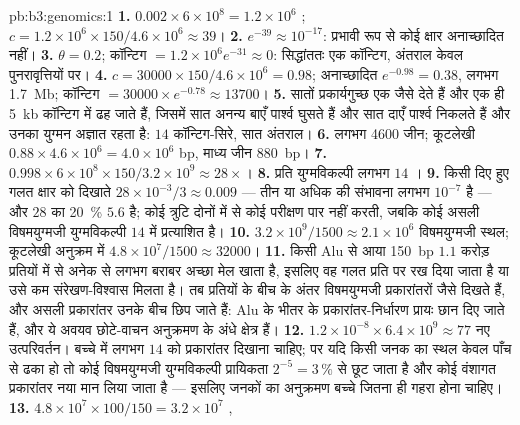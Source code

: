 \begin{solution}{pb:b3:genomics:1}
\textbf{1.} $0.002\times 6\times 10^{8} = 1.2\times 10^{6}$ ;
$c = 1.2\times 10^{6}\times 150/4.6\times 10^{6} \approx 39$।
\textbf{2.} $e^{-39} \approx 10^{-17}$: प्रभावी रूप से कोई क्षार
अनाच्छादित नहीं।
\textbf{3.} $\theta = 0.2$; कॉन्टिग $= 1.2\times 10^{6} e^{-31} \approx
0$: सिद्धांततः एक कॉन्टिग, अंतराल केवल पुनरावृत्तियों पर।
\textbf{4.} $c = \num{30000}\times 150/4.6\times 10^{6} = 0.98$;
अनाच्छादित $e^{-0.98} = 0.38$, लगभग \qty{1.7}{Mb}; कॉन्टिग $= \num{30000}
\times e^{-0.78} \approx \num{13700}$।
\textbf{5.} सातों प्रकार्यगुच्छ एक जैसे  देते हैं और एक ही
\qty{5}{kb} कॉन्टिग में ढह जाते हैं, जिसमें सात अनन्य बाएँ पार्श्व
घुसते हैं और सात दाएँ पार्श्व निकलते हैं और उनका युग्मन अज्ञात रहता है:
$14$ कॉन्टिग-सिरे, सात अंतराल।
\textbf{6.} लगभग \num{4600} जीन; कूटलेखी $0.88\times 4.6\times 10^{6}
= 4.0\times 10^{6}$ bp, माध्य जीन \qty{880}{bp}।
\textbf{7.} $0.998\times 6\times 10^{8}\times 150/3.2\times 10^{9}
\approx 28\times$।
\textbf{8.} प्रति युग्मविकल्पी लगभग $14$ ।
\textbf{9.} किसी दिए हुए गलत क्षार को दिखाते $28\times 10^{-3}/3 \approx 0.009$
 --- तीन या अधिक की संभावना लगभग $10^{-7}$ है --- और
$28$ का \qty{20}{\%} $5.6$  है; कोई त्रुटि दोनों में से कोई
परीक्षण पार नहीं करती, जबकि कोई असली विषमयुग्मजी युग्मविकल्पी $14$ में
प्रत्याशित है।
\textbf{10.} $3.2\times 10^{9}/1500 \approx 2.1\times 10^{6}$
विषमयुग्मजी स्थल; कूटलेखी अनुक्रम में $4.8\times 10^{7}/1500 \approx
\num{32000}$।
\textbf{11.} किसी Alu से आया \qty{150}{bp}  $1.1$ करोड़ प्रतियों
में से अनेक से लगभग बराबर अच्छा मेल खाता है, इसलिए वह गलत प्रति पर रख
दिया जाता है या उसे कम संरेखण-विश्वास मिलता है। तब प्रतियों के बीच के
अंतर विषमयुग्मजी प्रकारांतरों जैसे दिखते हैं, और असली प्रकारांतर उनके
बीच छिप जाते हैं: Alu के भीतर के प्रकारांतर-निर्धारण प्रायः छान दिए
जाते हैं, और ये अवयव छोटे-वाचन अनुक्रमण के अंधे क्षेत्र हैं।
\textbf{12.} $1.2\times 10^{-8}\times 6.4\times 10^{9} \approx 77$ नए
उत्परिवर्तन। बच्चे में लगभग $14$  को प्रकारांतर दिखाना चाहिए; पर
यदि किसी जनक का स्थल केवल पाँच  से ढका हो तो कोई विषमयुग्मजी
युग्मविकल्पी प्रायिकता $2^{-5} = 3\,\%$ से छूट जाता है और कोई वंशागत
प्रकारांतर नया मान लिया जाता है --- इसलिए जनकों का अनुक्रमण बच्चे जितना
ही गहरा होना चाहिए।
\textbf{13.} $4.8\times 10^{7}\times 100/150 = 3.2\times 10^{7}$ ,

\end{solution}
